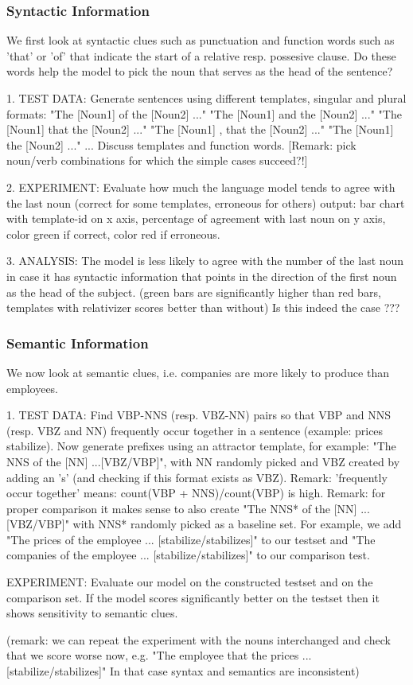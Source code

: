 \subsubsection{Syntactic Information}

We first look at syntactic clues such as punctuation
and function words such as 'that' or 'of'
that indicate the start of a relative resp. possesive
clause. Do these words help the model to pick
the noun that serves as the head of the sentence?

1. TEST DATA:
Generate sentences using different templates, singular and plural formats:
"The [Noun1] of the [Noun2] ..."
"The [Noun1] and the [Noun2] ..."
"The [Noun1] that the [Noun2] ..."
"The [Noun1] , that the [Noun2] ..."
"The [Noun1] the [Noun2] ..."
...
Discuss templates and function words.
[Remark: pick noun/verb combinations for which the simple cases succeed?!]

2. EXPERIMENT:
Evaluate how much the language model tends to agree with the last noun 
(correct for some templates, erroneous for others)
output: bar chart with template-id on x axis, percentage of agreement
with last noun on y axis, color green if correct, color red if erroneous.  

3. ANALYSIS:
The model is less likely to agree with the number of the 
last noun in case it has syntactic information
that points in the direction of the first noun as the head of the subject.
(green bars are significantly higher than red bars,
templates with relativizer scores better than without)
Is this indeed the case ???

\subsubsection{Semantic Information}

We now look at semantic clues, i.e. companies
are more likely to produce than employees.

1. TEST DATA:
Find VBP-NNS (resp. VBZ-NN) pairs so that VBP and NNS (resp. VBZ and NN) frequently occur together in a sentence (example: prices stabilize).
Now generate prefixes using an attractor template, for example: "The NNS of the [NN] ...[VBZ/VBP]",
with NN randomly picked and VBZ created by adding an 's' (and checking if this format exists as VBZ). 
Remark: 'frequently occur together' means: count(VBP + NNS)/count(VBP) is high.
Remark: for proper comparison it makes sense to also create "The NNS* of the [NN] ...[VBZ/VBP]"
with NNS* randomly picked as a baseline set.
For example, we add "The prices of the employee ... [stabilize/stabilizes]" to our testset
and "The companies of the employee ... [stabilize/stabilizes]" to our comparison test.

EXPERIMENT:
Evaluate our model on the constructed testset and on the comparison set.
If the model scores significantly better on the testset
then it shows sensitivity to semantic clues.

(remark: we can repeat the experiment with the nouns interchanged and check that we score worse now,
e.g. "The employee that the prices ... [stabilize/stabilizes]" 
In that case syntax and semantics are inconsistent)